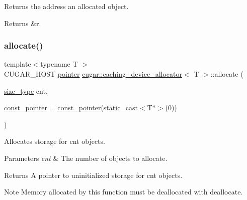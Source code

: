 Returns the address an allocated object. \begin{DoxyReturn}{Returns}
{\ttfamily \&r}. 
\end{DoxyReturn}
\mbox{\label{structcugar_1_1caching__device__allocator_a4fd1b150253eeb1ae74192745f4ef957}} 
\subsubsection{\texorpdfstring{allocate()}{allocate()}}
{\footnotesize\ttfamily template$<$typename T $>$ \\
C\+U\+G\+A\+R\+\_\+\+H\+O\+ST \hyperlink{structcugar_1_1caching__device__allocator_a442ab01357a3851bb0e9f17c5e49fce3}{pointer} \hyperlink{structcugar_1_1caching__device__allocator}{cugar\+::caching\+\_\+device\+\_\+allocator}$<$ T $>$\+::allocate (\begin{DoxyParamCaption}\item[{\hyperlink{structcugar_1_1caching__device__allocator_a6ac404077fed53edacca4e62b15fdbe9}{size\+\_\+type}}]{cnt,  }\item[{\hyperlink{structcugar_1_1caching__device__allocator_a56ae6e43547f283ab330befe1643e3dd}{const\+\_\+pointer}}]{ = {\ttfamily \hyperlink{structcugar_1_1caching__device__allocator_a56ae6e43547f283ab330befe1643e3dd}{const\+\_\+pointer}(static\+\_\+cast$<$T$\ast$$>$(0))} }\end{DoxyParamCaption})\hspace{0.3cm}{\ttfamily [inline]}}

Allocates storage for {\ttfamily cnt} objects. 
\begin{DoxyParams}{Parameters}
{\em cnt} & The number of objects to allocate. \\
\hline
\end{DoxyParams}
\begin{DoxyReturn}{Returns}
A {\ttfamily pointer} to uninitialized storage for {\ttfamily cnt} objects. 
\end{DoxyReturn}
\begin{DoxyNote}{Note}
Memory allocated by this function must be deallocated with {\ttfamily deallocate}. 
\end{DoxyNote}
\mbox{\label{structcugar_1_1caching__device__allocator_a7c66c825fe71f754851288308f4acb60}} 
